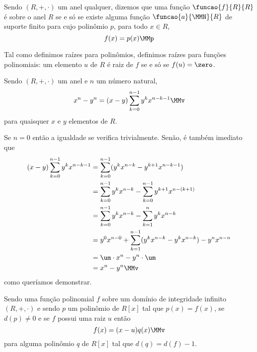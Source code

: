 \begin{Funções polinomiais}

\begin{Def}
  Sendo $(R,+,\cdot)$ um anel qualquer,
  dizemos que uma função
  $\funcao{f}{R}{R}$ é 
  sobre o anel $R$ se e só se existe alguma função
  $\funcao{a}{\MMN}{R}$ de suporte finito para cujo polinômio $p$,
  para todo $x\in R$,
  \begin{equation*}
    f(x) = p(x)\MMp
  \end{equation*}
\end{Def}

\begin{Obs}
  Tal como definimos raízes para polinômios, definimos raízes para
  funções polinomiais: um elemento $u$ de $R$ é raiz de $f$ se e só se
  $f(u)=\zero$.
\end{Obs}

\begin{Lem}\label{lemxnun}
  Sendo $(R,+,\cdot)$ um anel e $n$ um número natural,
  \begin{equation*}
    x^n - y^n = (x-y)\sum_{k=0}^{n-1}y^kx^{n-k-1}\MMv
  \end{equation*}
  para quaisquer $x$ e $y$ elementos de $R$.
\end{Lem}

\begin{dem}
  Se $n=0$ então a igualdade se verifica trivialmente. Senão,
  é também imediato que
  \begin{equation*}
    \begin{aligned}
      (x-y)\sum_{k=0}^{n-1}y^kx^{n-k-1}
        &= \sum_{k=0}^{n-1}(y^kx^{n-k}-y^{k+1}x^{n-k-1}) \\
        &= \sum_{k=0}^{n-1}y^kx^{n-k} -
           \sum_{k=0}^{n-1}y^{k+1}x^{n-(k+1)}\\
        &= \sum_{k=0}^{n-1}y^kx^{n-k} -
           \sum_{k=1}^{n}y^{k}x^{n-k}\\
        &= y^0x^{n-0} + \sum_{k=1}^{n-1}(y^kx^{n-k} - y^{k}x^{n-k})
           - y^nx^{n-n}\\
        &= \um\cdot x^n - y^n\cdot \um\\
        &= x^n - y^n\MMv
    \end{aligned}
  \end{equation*}
  como queríamos demonstrar.
\end{dem}

\begin{Lem}
  Sendo uma função polinomial $f$
  sobre um domínio de integridade
  infinito $(R,+,\cdot)$ e sendo $p$ um polinômio de $R[x]$ tal que
  $p(x)=f(x)$, se $d(p)\neq 0$ e se $f$ possui uma raiz $u$ então
  \begin{equation*}
    f(x) = (x-u)q(x)\MMv
  \end{equation*}
  para alguma polinômio $q$ de $R[x]$ tal que
  $d(q) = d(f)-1$.
\end{Lem}


\end{Funções polinomiais}
